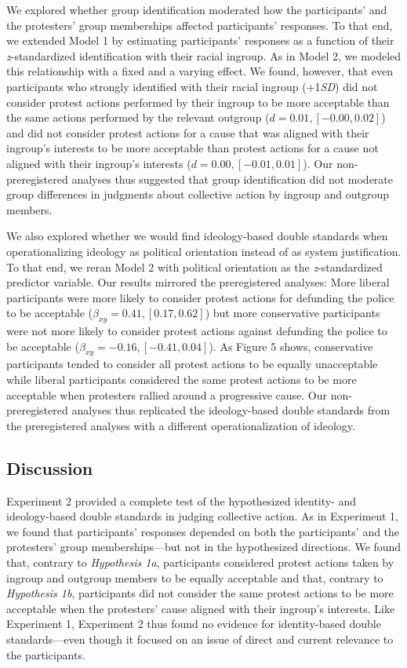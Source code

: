 \documentclass[twocolumn, 11pt, letterpaper]{article}
\begin{document}
We explored whether group identification moderated how the participants'
and the protesters' group memberships affected participants' responses.
To that end, we extended Model 1 by estimating participants' responses
as a function of their \emph{z}-standardized identification with their
racial ingroup. As in Model 2, we modeled this relationship with a fixed
and a varying effect. We found, however, that even participants who
strongly identified with their racial ingroup (+1\emph{SD}) did not
consider protest actions performed by their ingroup to be more
acceptable than the same actions performed by the relevant outgroup
(\(d = 0.01, [-0.00, 0.02]\)) and did not consider protest actions for a
cause that was aligned with their ingroup's interests to be more
acceptable than protest actions for a cause not aligned with their
ingroup's interests (\(d = 0.00, [-0.01, 0.01]\)). Our non-preregistered
analyses thus suggested that group identification did not moderate group
differences in judgments about collective action by ingroup and outgroup
members.

We also explored whether we would find ideology-based double standards
when operationalizing ideology as political orientation instead of as
system justification. To that end, we reran Model 2 with political
orientation as the \emph{z}-standardized predictor variable. Our results
mirrored the preregistered analyses: More liberal participants were more
likely to consider protest actions for defunding the police to be
acceptable (\(\beta_{xy} = 0.41, [0.17, 0.62]\)) but more conservative
participants were not more likely to consider protest actions against
defunding the police to be acceptable
(\(\beta_{xy} = -0.16, [-0.41, 0.04]\)). As Figure 5 shows, conservative
participants tended to consider all protest actions to be equally
unacceptable while liberal participants considered the same protest
actions to be more acceptable when protesters rallied around a
progressive cause. Our non-preregistered analyses thus replicated the
ideology-based double standards from the preregistered analyses with a
different operationalization of ideology.

\hypertarget{discussion-1}{%
\subsection{Discussion}\label{discussion-1}}

Experiment 2 provided a complete test of the hypothesized identity- and
ideology-based double standards in judging collective action. As in
Experiment 1, we found that participants' responses depended on both the
participants' and the protesters' group memberships---but not in the
hypothesized directions. We found that, contrary to \emph{Hypothesis
1a}, participants considered protest actions taken by ingroup and
outgroup members to be equally acceptable and that, contrary to
\emph{Hypothesis 1b}, participants did not consider the same protest
actions to be more acceptable when the protesters' cause aligned with
their ingroup's interests. Like Experiment 1, Experiment 2 thus found no
evidence for identity-based double standards---even though it focused on
an issue of direct and current relevance to the participants.
\end{document}
